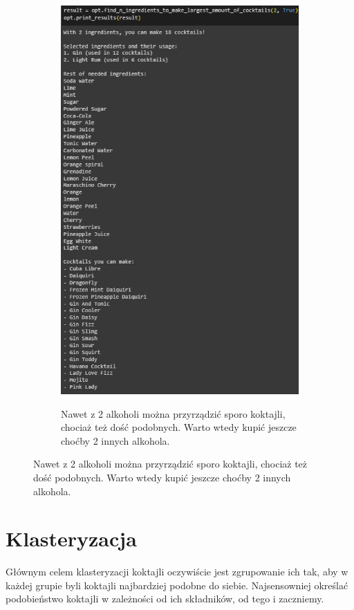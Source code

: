 \documentclass{article}
\begin{document}
\begin{figure}[ht]
\begin{subfigure}{0.38\textwidth}
        \includegraphics[width=\textwidth]{opt_2.png}
        \label{fig:image2}
        \caption{Nawet z 2 alkoholi można przyrządzić sporo koktajli, chociaż też dość podobnych. Warto wtedy kupić jeszcze choćby 2 innych alkohola.}
    \end{subfigure}
    
\end{figure}

\clearpage

\section{Klasteryzacja}
Głównym celem klasteryzacji koktajli oczywiście jest zgrupowanie ich tak, aby w każdej grupie byli koktajli najbardziej podobne do siebie.
\newline
Najsensowniej określać podobieństwo koktajli w zależności od ich składników, od tego i zaczniemy.
\end{document}
